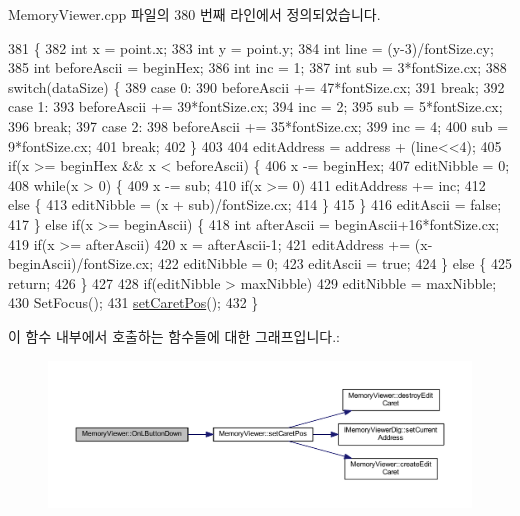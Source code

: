Memory\+Viewer.\+cpp 파일의 380 번째 라인에서 정의되었습니다.


\begin{DoxyCode}
381 \{
382   \textcolor{keywordtype}{int} x = point.x;
383   \textcolor{keywordtype}{int} y = point.y;
384   \textcolor{keywordtype}{int} line = (y-3)/fontSize.cy;
385   \textcolor{keywordtype}{int} beforeAscii = beginHex;
386   \textcolor{keywordtype}{int} inc = 1;
387   \textcolor{keywordtype}{int} sub = 3*fontSize.cx;
388   \textcolor{keywordflow}{switch}(dataSize) \{
389   \textcolor{keywordflow}{case} 0:
390     beforeAscii += 47*fontSize.cx;
391     \textcolor{keywordflow}{break};
392   \textcolor{keywordflow}{case} 1:
393     beforeAscii += 39*fontSize.cx;
394     inc = 2;
395     sub = 5*fontSize.cx;
396     \textcolor{keywordflow}{break};
397   \textcolor{keywordflow}{case} 2:
398     beforeAscii += 35*fontSize.cx;
399     inc = 4;
400     sub = 9*fontSize.cx;
401     \textcolor{keywordflow}{break};
402   \}
403   
404   editAddress = address + (line<<4);
405   \textcolor{keywordflow}{if}(x >= beginHex && x < beforeAscii) \{
406     x -= beginHex;
407     editNibble = 0;
408     \textcolor{keywordflow}{while}(x > 0) \{
409       x -= sub;
410       \textcolor{keywordflow}{if}(x >= 0)
411         editAddress += inc;
412       \textcolor{keywordflow}{else} \{
413         editNibble = (x + sub)/fontSize.cx;
414       \}
415     \}
416     editAscii = \textcolor{keyword}{false};
417   \} \textcolor{keywordflow}{else} \textcolor{keywordflow}{if}(x >= beginAscii) \{
418     \textcolor{keywordtype}{int} afterAscii = beginAscii+16*fontSize.cx;
419     \textcolor{keywordflow}{if}(x >= afterAscii) 
420       x = afterAscii-1;
421     editAddress += (x-beginAscii)/fontSize.cx;
422     editNibble = 0;
423     editAscii = \textcolor{keyword}{true};
424   \} \textcolor{keywordflow}{else} \{
425     \textcolor{keywordflow}{return};
426   \}
427 
428   \textcolor{keywordflow}{if}(editNibble > maxNibble)
429     editNibble = maxNibble;
430   SetFocus();
431   \mbox{\hyperlink{class_memory_viewer_abfed49727a6de1b52e5495ed96816759}{setCaretPos}}();
432 \}
\end{DoxyCode}
이 함수 내부에서 호출하는 함수들에 대한 그래프입니다.\+:
\nopagebreak
\begin{figure}[H]
\begin{center}
\leavevmode
\includegraphics[width=350pt]{class_memory_viewer_aa17edb0fbc507fe79493ec235cd124f2_cgraph}
\end{center}
\end{figure}
\mbox{\label{class_memory_viewer_a83e2e0a597c7c25d7fc496411ec1d46f}} 
